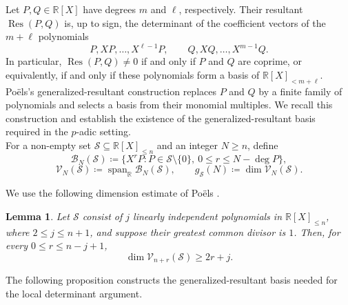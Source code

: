 \documentclass[10pt,a4paper]{amsart}
\newtheorem{lemma}[theorem]{Lemma}
\newcommand{\R}{\mathbb R}
\newcommand{\calB}{\mathcal B}
\newcommand{\calV}{\mathcal V}
\newcommand{\Span}{\operatorname{span}}
\begin{document}
Let $P,Q\in\R[X]$ have degrees $m$ and $\ell$, respectively. Their
resultant $\operatorname{Res}(P,Q)$ is, up to sign, the determinant of the
coefficient vectors of the $m+\ell$ polynomials
$$
P,XP,\ldots,X^{\ell-1}P,
\qquad
Q,XQ,\ldots,X^{m-1}Q.
$$
In particular, $\operatorname{Res}(P,Q)\neq0$ if and only if $P$ and $Q$ are
coprime, or equivalently, if and only if these polynomials form a basis of
$\R[X]_{<m+\ell}$. Po\"els's generalized-resultant construction replaces
$P$ and $Q$ by a finite family of polynomials and selects a basis from their
monomial multiples. We recall this construction and establish the existence of
the generalized-resultant basis required in the $p$-adic setting.\\

 For a
non-empty set $\mathcal S\subseteq\R[X]_{\leq n}$ and an integer $N\geq n$,
define
$$
\calB_N(\mathcal S)
\coloneqq
\{X^rP: P\in\mathcal S\setminus\{0\},\ 0\leq r\leq N-\deg P\},
$$
$$
\calV_N(\mathcal S)
\coloneqq\Span_{\R}\calB_N(\mathcal S),
\qquad
g_{\mathcal S}(N)\coloneqq\dim\calV_N(\mathcal S).
$$


We use the following dimension estimate of Po\"els
\cite[Lemma~5.2]{PoelsWirsing}.

\begin{lemma}\label{lem:intermediate-dimension}
Let $\mathcal S$ consist of $j$ linearly independent polynomials in $\R[X]_{\leq n}$, where $2\leq j\leq n+1$, and suppose their greatest common divisor is $1$. Then, for every $0\leq r\leq n-j+1$,
$$
\dim\calV_{n+r}(\mathcal S)\geq2r+j.
$$
\end{lemma}

The following proposition constructs the generalized-resultant basis needed
for the local determinant argument.
\end{document}
